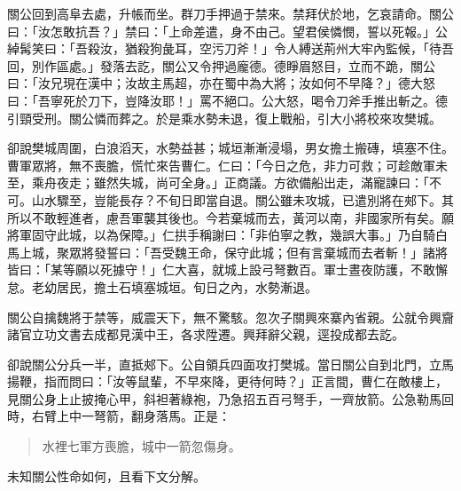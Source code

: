 關公回到高阜去處，升帳而坐。群刀手押過于禁來。禁拜伏於地，乞哀請命。關公曰：「汝怎敢抗吾？」禁曰：「上命差遣，身不由己。望君侯憐憫，誓以死報。」公綽髯笑曰：「吾殺汝，猶殺狗彘耳，空污刀斧！」令人縛送荊州大牢內監候，「待吾回，別作區處。」發落去訖，關公又令押過龐德。德睜眉怒目，立而不跪，關公曰：「汝兄現在漢中；汝故主馬超，亦在蜀中為大將；汝如何不早降？」德大怒曰：「吾寧死於刀下，豈降汝耶！」罵不絕口。公大怒，喝令刀斧手推出斬之。德引頸受刑。關公憐而葬之。於是乘水勢未退，復上戰船，引大小將校來攻樊城。

卻說樊城周圍，白浪滔天，水勢益甚；城垣漸漸浸塌，男女擔土搬磚，填塞不住。曹軍眾將，無不喪膽，慌忙來告曹仁。仁曰：「今日之危，非力可救；可趁敵軍未至，乘舟夜走；雖然失城，尚可全身。」正商議。方欲備船出走，滿寵諫曰：「不可。山水驟至，豈能長存？不旬日即當自退。關公雖未攻城，已遣別將在郟下。其所以不敢輕進者，慮吾軍襲其後也。今若棄城而去，黃河以南，非國家所有矣。願將軍固守此城，以為保障。」仁拱手稱謝曰：「非伯寧之教，幾誤大事。」乃自騎白馬上城，聚眾將發誓曰：「吾受魏王命，保守此城；但有言棄城而去者斬！」諸將皆曰：「某等願以死據守！」仁大喜，就城上設弓弩數百。軍士晝夜防護，不敢懈怠。老幼居民，擔土石填塞城垣。旬日之內，水勢漸退。

關公自擒魏將于禁等，威震天下，無不驚駭。忽次子關興來寨內省親。公就令興齎諸官立功文書去成都見漢中王，各求陞遷。興拜辭父親，逕投成都去訖。

卻說關公分兵一半，直抵郟下。公自領兵四面攻打樊城。當日關公自到北門，立馬揚鞭，指而問曰：「汝等鼠輩，不早來降，更待何時？」正言間，曹仁在敵樓上，見關公身上止披掩心甲，斜袒著綠袍，乃急招五百弓弩手，一齊放箭。公急勒馬回時，右臂上中一弩箭，翻身落馬。正是：

\begin{quote}
水裡七軍方喪膽，城中一箭忽傷身。
\end{quote}

未知關公性命如何，且看下文分解。
